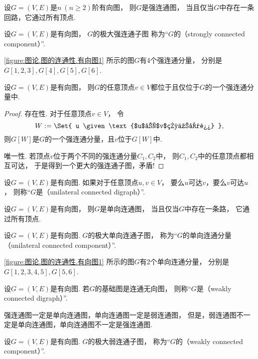 \begin{theorem}
设\(G = (V,E)\)是\(n\ (n\geq2)\)阶有向图，
则\(G\)是强连通图，
当且仅当\(G\)中存在一条回路，它通过所有顶点.
\end{theorem}

\begin{definition}
设\(G = (V,E)\)是有向图，
\(G\)的极大强连通子图
称为“\(G\)的（strongly connected component）”.
\end{definition}

\cref{figure:图论.图的连通性.有向图1} 所示的图\(G\)有4个强连通分量，
分别是\(G[1,2,3],G[4],G[5],G[6]\).

\begin{theorem}
设\(G = (V,E)\)是有向图，
则\(G\)的任意顶点\(v \in V\)都位于且仅位于\(G\)的一个强连通分量中.
\begin{proof}
存在性.
对于任意顶点\(v \in V\)，
令\[
	W \defeq \Set{ u \given \text{$u$和$v$相互可达} },
\]
则\(G[W]\)是\(G\)的一个强连通分量，且\(v\)位于\(G[W]\)中.

唯一性.
若顶点\(v\)位于两个不同的强连通分量\(C_1,C_2\)中，
则\(C_1,C_2\)中的任意顶点都相互可达，
于是得到一个更大的强连通子图，矛盾!
\end{proof}
\end{theorem}

\begin{definition}
设\(G = (V,E)\)是有向图.
如果对于任意顶点\(u,v \in V\)，
要么\(u\)可达\(v\)，要么\(v\)可达\(u\)，
则称“\(G\)是（unilateral connected digraph）”.
\end{definition}

\begin{theorem}
设\(G = (V,E)\)是有向图，
则\(G\)是单向连通图，
当且仅当\(G\)中存在一条路，
它通过所有顶点.
\end{theorem}

\begin{definition}
设\(G = (V,E)\)是有向图.
\(G\)的极大单向连通子图，
称为“\(G\)的单向连通分量（unilateral connected component）”.
\end{definition}

\cref{figure:图论.图的连通性.有向图1} 所示的图\(G\)有2个单向连通分量，
分别是\(G[1,2,3,4,5],G[5,6]\).

\begin{definition}
设\(G = (V,E)\)是有向图.
若\(G\)的基础图是连通无向图，
则称“\(G\)是（weakly connected digraph）”.
\end{definition}

强连通图一定是单向连通图，单向连通图一定是弱连通图，
但是，弱连通图不一定是单向连通图，单向连通图不一定是强连通图.

\begin{definition}
设\(G = (V,E)\)是有向图.
\(G\)的极大弱连通子图，
称为“\(G\)的（weakly connected component）”.
\end{definition}
